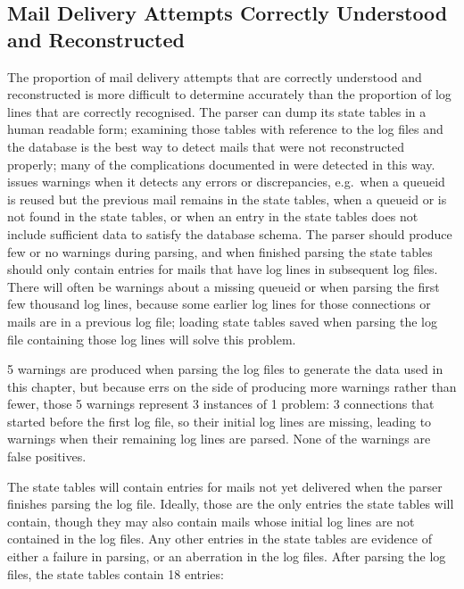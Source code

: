 \subsection{Mail Delivery Attempts Correctly Understood and Reconstructed}

\label{mails-covered}

The proportion of mail delivery attempts that are correctly understood and
reconstructed is more difficult to determine accurately than the proportion
of log lines that are correctly recognised.  The parser can dump its state
tables in a human readable form; examining those tables with reference to
the log files and the database is the best way to detect mails that were
not reconstructed properly; many of the complications documented in
 were detected in this way.  \parsername{} issues
warnings when it detects any errors or discrepancies, e.g.\ when a queueid
is reused but the previous mail remains in the state tables, when a queueid
or  is not found in the state tables, or when an entry in the
state tables does not include sufficient data to satisfy the database
schema.  The parser should produce few or no warnings during parsing, and
when finished parsing the state tables should only contain entries for
mails that have log lines in subsequent log files.  There will often be
warnings about a missing queueid or  when parsing the first
few thousand log lines, because some earlier log lines for those
connections or mails are in a previous log file; loading state tables saved
when parsing the log file containing those log lines will solve this
problem.

5 warnings are produced when parsing the \numberOFlogFILES{} log files to
generate the data used in this chapter, but because \parsername{} errs on
the side of producing more warnings rather than fewer, those 5 warnings
represent 3 instances of 1 problem: 3 connections that started before the
first log file, so their initial log lines are missing, leading to warnings
when their remaining log lines are parsed.  None of the warnings are false
positives.

The state tables will contain entries for mails not yet delivered when the
parser finishes parsing the log file.  Ideally, those are the only entries
the state tables will contain, though they may also contain mails whose
initial log lines are not contained in the log files.  Any other entries in
the state tables are evidence of either a failure in parsing, or an
aberration in the log files.  After parsing the \numberOFlogFILES{} log
files, the state tables contain 18 entries:

